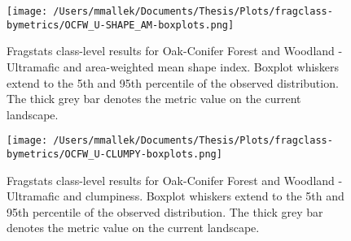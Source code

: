 \begin{figure}[!htbp]
\centering
    \texttt{[image: /Users/mmallek/Documents/Thesis/Plots/fragclass-bymetrics/OCFW\_U-SHAPE\_AM-boxplots.png]}
  \caption{Fragstats class-level results for Oak-Conifer Forest and Woodland - Ultramafic and area-weighted mean shape index. Boxplot whiskers extend to the 5th and 95th percentile of the observed distribution. The thick grey bar denotes the metric value on the current landscape.}
  \label{fig:ocfwu_shapeam}
\end{figure}


\begin{figure}[!htbp]
\centering
    \texttt{[image: /Users/mmallek/Documents/Thesis/Plots/fragclass-bymetrics/OCFW\_U-CLUMPY-boxplots.png]}
  \caption{Fragstats class-level results for Oak-Conifer Forest and Woodland - Ultramafic and clumpiness. Boxplot whiskers extend to the 5th and 95th percentile of the observed distribution. The thick grey bar denotes the metric value on the current landscape.}
  \label{fig:ocfwu_clumpy}
\end{figure}

